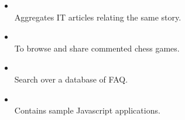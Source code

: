 %
%
%

\twocolumnsection
{
\begin{skills}
\end{skills}}
{
\vspace{1em}
\begin{itemize}
	\item {} \\Aggregates IT articles relating the same story.  	
	\item {} \\To browse and share commented chess games.
	\item {} \\Search over a database of FAQ.
	\item {} \\Contains sample Javascript applications.
\end{itemize}
}
